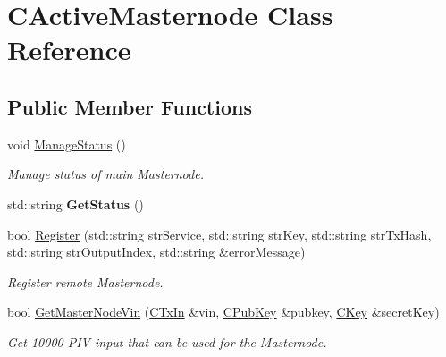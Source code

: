 \hypertarget{class_c_active_masternode}{}\section{C\+Active\+Masternode Class Reference}
\label{class_c_active_masternode}
\subsection*{Public Member Functions}
\begin{DoxyCompactItemize}
\item 
\mbox{\label{class_c_active_masternode_a8004b3b2100da7dcfedbd1e959633e51}} 
void \mbox{\hyperlink{class_c_active_masternode_a8004b3b2100da7dcfedbd1e959633e51}{Manage\+Status}} ()
\begin{DoxyCompactList}\small\item\em Manage status of main Masternode. \end{DoxyCompactList}\item 
\mbox{\label{class_c_active_masternode_a64035096453592380bcb606a75237c60}} 
std\+::string {\bfseries Get\+Status} ()
\item 
\mbox{\label{class_c_active_masternode_a99e26870efec1ea98738cda1a5a85702}} 
bool \mbox{\hyperlink{class_c_active_masternode_a99e26870efec1ea98738cda1a5a85702}{Register}} (std\+::string str\+Service, std\+::string str\+Key, std\+::string str\+Tx\+Hash, std\+::string str\+Output\+Index, std\+::string \&error\+Message)
\begin{DoxyCompactList}\small\item\em Register remote Masternode. \end{DoxyCompactList}\item 
\mbox{\label{class_c_active_masternode_af9f32ec3d13b161d6a89839dab17b154}} 
bool \mbox{\hyperlink{class_c_active_masternode_af9f32ec3d13b161d6a89839dab17b154}{Get\+Master\+Node\+Vin}} (\mbox{\hyperlink{class_c_tx_in}{C\+Tx\+In}} \&vin, \mbox{\hyperlink{class_c_pub_key}{C\+Pub\+Key}} \&pubkey, \mbox{\hyperlink{class_c_key}{C\+Key}} \&secret\+Key)
\begin{DoxyCompactList}\small\item\em Get 10000 P\+IV input that can be used for the Masternode. \end{DoxyCompactList}\item 

\end{DoxyCompactItemize}
